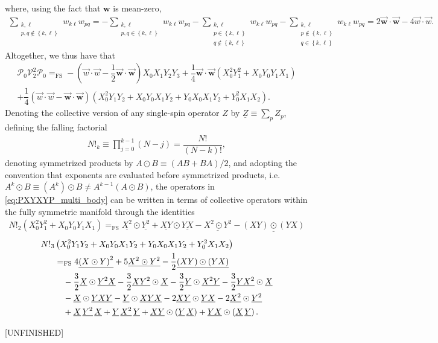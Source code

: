 \documentclass[nofootinbib,notitlepage,11pt]{revtex4-2}
\newcommand{\f}[2]{\dfrac{#1}{#2}} %
\newcommand{\p}[1]{\left(#1\right)} %
\renewcommand{\set}[1]{\left\{#1\right\}} %
\renewcommand{\c}{\cdot} %
\newcommand{\m}{\bm} %
\renewcommand{\v}{\vec} %
\newcommand{\1}{\mathds{1}}
\renewcommand{\P}{\mathcal{P}}
\newcommand{\V}{\mathcal{V}}
\newcommand{\EQFS}{=_{\text{FS}}}
\newcommand{\col}{\underline}
\begin{document}
where, using the fact that $\m w$ is mean-zero,
\begin{align}
  \sum_{\substack{k,\ell\\p,q\notin\set{k,\ell}}} w_{k\ell} w_{pq}
  = - \sum_{\substack{k,\ell\\p,q\in\set{k,\ell}}} w_{k\ell} w_{pq}
  - \sum_{\substack{k,\ell\\p\in\set{k,\ell}\\q\notin\set{k,\ell}}}
  w_{k\ell} w_{pq}
  - \sum_{\substack{k,\ell\\p\notin\set{k,\ell}\\q\in\set{k,\ell}}}
  w_{k\ell} w_{pq}
  = 2 \v{\m w}\c\v{\m w} - 4 \v w\c\v w.
\end{align}
Altogether, we thus have that
\begin{multline}
  \P_0 \V_2^2 \P_0
  \EQFS -\p{\v w\c\v w - \f12 \v{\m w}\c\v{\m w}} X_0 X_1 Y_2 Y_3
  + \f14 \v{\m w}\c\v{\m w} \p{X_0^2 Y_1^2 + X_0 Y_0 Y_1 X_1} \\
  + \f14 \p{\v w\c\v w - \v{\m w}\c\v{\m w}}
  \p{X_0^2 Y_1 Y_2 + X_0 Y_0 X_1 Y_2
    + Y_0 X_0 X_1 Y_2 + Y_0^2 X_1 X_2}.
  \label{eq:PXYXYP_multi_body}
\end{multline}
Denoting the collective version of any single-spin operator $Z$ by
$\col{Z}\equiv\sum_pZ_p$, defining the falling factorial
\begin{align}
  N!_k \equiv \prod_{j=0}^{k-1} \p{N-j} = \f{N!}{\p{N-k}!},
\end{align}
denoting symmetrized products by $A\odot B\equiv\p{AB+BA}/2$, and
adopting the convention that exponents are evaluated before
symmetrized products,
i.e.~$A^k\odot B\equiv\p{A^k}\odot B\ne A^{k-1}\p{A\odot B}$, the
operators in \eqref{eq:PXYXYP_multi_body} can be written in terms of
collective operators within the fully symmetric manifold through the
identities
\begin{align}
  N!_2 \p{X_0^2 Y_1^2 + X_0 Y_0 Y_1 X_1}
  \EQFS \col{X^2}\odot\col{Y^2} + \col{XY} \odot \col{YX}
  - \col{X^2\odot Y^2} - \col{\p{XY}\odot\p{YX}}
\end{align}
\begin{align}
  N!_3 &\p{X_0^2 Y_1 Y_2 + X_0 Y_0 X_1 Y_2
    + Y_0 X_0 X_1 Y_2 + Y_0^2 X_1 X_2}
  \notag \\
  &\EQFS 4\col{\p{X\odot Y}^2} + 5 \col{X^2\odot Y^2} - \f12\col{\p{XY}\odot\p{YX}}
  \notag \\
  &\quad- \f32 \col{X}\odot\col{Y^2X} - \f32 \col{XY^2}\odot\col{X}
  - \f32 \col{Y}\odot\col{X^2Y} - \f32 \col{YX^2}\odot\col{X}
  \notag \\
  &\quad- \col{X}\odot\col{YXY} - \col{Y}\odot\col{XYX}
  - 2 \col{XY}\odot\col{YX} - 2\col{X^2}\odot\col{Y^2}
  \notag \\
  &\quad+ \col{X}\,\col{Y^2}\,\col{X} + \col{Y}\,\col{X^2}\,\col{Y}
  +\col{XY}\odot\p{\col{Y}\,\col{X}} + \col{YX}\odot\p{\col{X}\,\col{Y}}.
\end{align}

[UNFINISHED]


\end{document}
